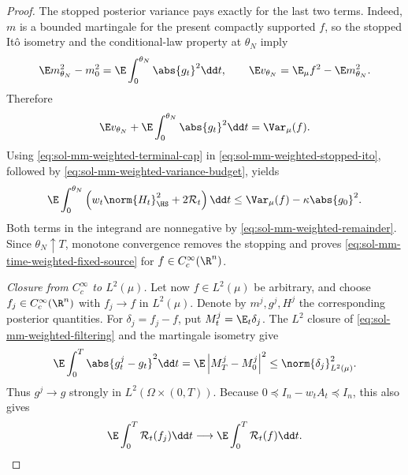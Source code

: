 \documentclass[../main.tex]{subfiles}
\begin{document}
\begin{proof}
The stopped posterior variance pays exactly for the last two terms.  Indeed, $m$ is a bounded
martingale for the present compactly supported $f$, so the stopped It\^o isometry and the
conditional-law property at $\theta_N$ imply
\[
  \E m_{\theta_N}^2-m_0^2
  =\E\int_0^{\theta_N}\abs{g_t}^2\dd t,
  \qquad
  \E v_{\theta_N}=\E_\mu f^2-\E m_{\theta_N}^2.
\]
Therefore
\begin{equation}
  \E v_{\theta_N}
  +\E\int_0^{\theta_N}\abs{g_t}^2\dd t
  =\Var_\mu(f).
  \label{eq:sol-mm-weighted-variance-budget}
\end{equation}
Using \eqref{eq:sol-mm-weighted-terminal-cap} in
\eqref{eq:sol-mm-weighted-stopped-ito}, followed by
\eqref{eq:sol-mm-weighted-variance-budget}, yields
\begin{equation}
 \E\int_0^{\theta_N}
 \left(w_t\norm{H_t}_{\HS}^2+2\mathcal R_t\right)\dd t
 \le\Var_\mu(f)-\kappa\abs{g_0}^2.
 \label{eq:sol-mm-weighted-stopped-bound}
\end{equation}
Both terms in the integrand are nonnegative by
\eqref{eq:sol-mm-weighted-remainder}.  Since $\theta_N\uparrow T$, monotone convergence removes
the stopping and proves \eqref{eq:sol-mm-time-weighted-fixed-source} for
$f\in C_c^\infty(\R^n)$.

\medskip
\noindent\emph{Closure from $C_c^\infty$ to $L^2(\mu)$.}
Let now $f\in L^2(\mu)$ be arbitrary, and choose $f_j\in C_c^\infty(\R^n)$ with
$f_j\to f$ in $L^2(\mu)$.  Denote by $m^j,g^j,H^j$ the corresponding posterior quantities.
For $\delta_j=f_j-f$, put $M_t^j=\E_t\delta_j$.  The $L^2$ closure of
\eqref{eq:sol-mm-weighted-filtering} and the martingale isometry give
\begin{equation}
  \E\int_0^T\abs{g_t^j-g_t}^2\dd t
  =\E\left|M_T^j-M_0^j\right|^2
  \le\norm{\delta_j}_{L^2(\mu)}^2.
  \label{eq:sol-mm-weighted-g-closure}
\end{equation}
Thus $g^j\to g$ strongly in $L^2(\Omega\times(0,T))$.  Because
$0\preceq I_n-w_tA_t\preceq I_n$, this also gives
\begin{equation}
  \E\int_0^T\mathcal R_t(f_j)\dd t
  \longrightarrow
  \E\int_0^T\mathcal R_t(f)\dd t.
  \label{eq:sol-mm-weighted-remainder-closure}
\end{equation}


\end{proof}
\end{document}
